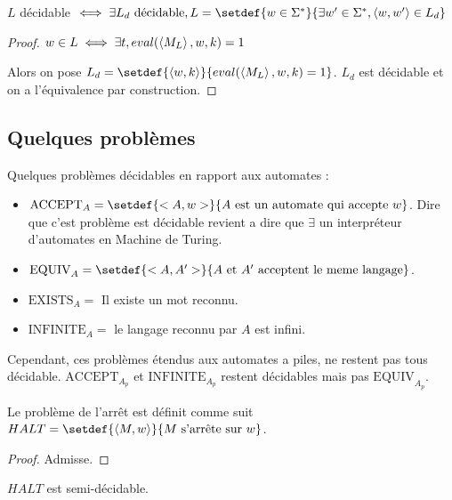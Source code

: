 \begin{prop}
	$L$ décidable $\iff \exists L_d \text{ décidable}, L = \setdef {w \in \mots} {\exists w' \in \mots, \encode{w,w'} \in L_d}$
\end{prop}


\begin{proof}
	$w \in L \iff \exists t, eval(\left\langle M_L\right\rangle, w, k) = 1$

	Alors on pose $L_d = \setdef {\encode{w, k}} {eval(\encode {M_L}, w,k) = 1}$.
	$L_d$ est décidable et on a l'équivalence par construction.
\end{proof}



\subsection{Quelques problèmes}

Quelques problèmes décidables en rapport aux automates :

\begin{itemize}
	\item $\text{ACCEPT}_A = \setdef {<A,w>} {A \text { est un automate qui accepte } w}$.
	      Dire que c'est problème est décidable revient a dire que $\exists$ un interpréteur d'automates en Machine de Turing.
	\item $\text{EQUIV}_A = \setdef {<A,A'>} {A \text { et } A' \text{ acceptent le meme langage}}$.
	\item $\text{EXISTS}_A = $ Il existe un mot reconnu.
	\item $\text{INFINITE}_A = $ le langage reconnu par $A$ est infini.
\end{itemize}

Cependant, ces problèmes étendus aux automates a piles, ne restent pas tous décidable.
$\text{ACCEPT}_{A_p}$ et $\text{INFINITE}_{A_p}$ restent décidables mais pas $\text{EQUIV}_{A_p}$.

\begin{definition}
	Le problème de l'arrêt est définit comme suit $HALT = \setdef {\encode{M,w}} {M \text{ s'arrête sur } w}$.
\end{definition}

\begin{proof}
	Admisse.
\end{proof}

\begin{prop}
	$HALT$ est semi-décidable.
\end{prop}

